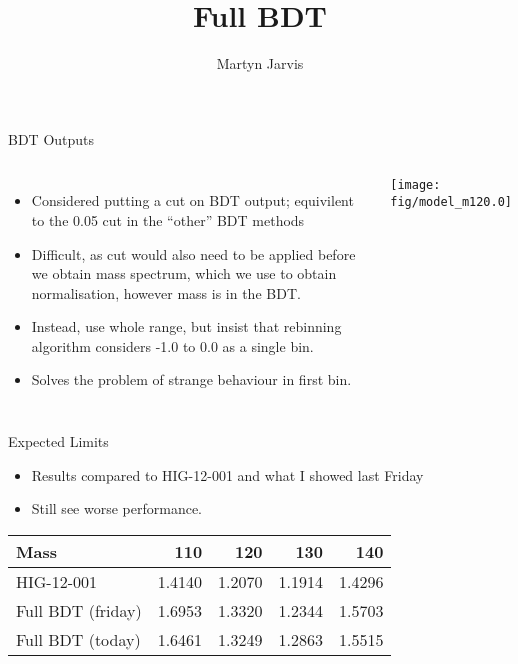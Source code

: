 \documentclass[t, 8pt]{beamer}
\author{Martyn Jarvis}
\title[Full BDT]{Full BDT}
\begin{document}


\begin{frame}{BDT Outputs}
  \begin{columns}[c]
  \begin{itemize}
    \item Considered putting a cut on BDT output; equivilent to the 0.05 cut in the ``other'' BDT methods
    \item Difficult, as cut would also need to be applied before we obtain mass spectrum, which we use to obtain normalisation, however mass is in the BDT.
    \item Instead, use whole range, but insist that rebinning algorithm considers -1.0 to 0.0 as a single bin. 
    \item Solves the problem of strange behaviour in first bin.
  \end{itemize}
    \texttt{[image: fig/model\_m120.0]}
  \end{columns}
\end{frame}

\begin{frame}{Expected Limits}
  \vspace{1cm}
  \begin{itemize}
    \item Results compared to HIG-12-001 and what I showed last Friday
    \item Still see worse performance.
  \end{itemize}
\begin{center}

\begin{table}[htbp]
\begin{tabular}{|l|r r r r |}
\hline
Mass                & 110    & 120    & 130    & 140    \\ \hline
HIG-12-001          & 1.4140 & 1.2070 & 1.1914 & 1.4296 \\ \hline
Full BDT (friday)   & 1.6953 & 1.3320 & 1.2344 & 1.5703 \\ 
Full BDT (today)    & 1.6461 & 1.3249 & 1.2863 & 1.5515 \\ \hline
\end{tabular}
\end{table}
\end{center}
\end{frame}
\end{document}
